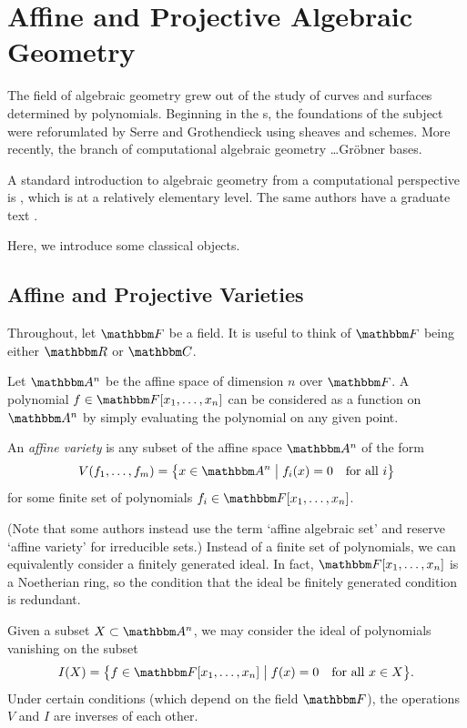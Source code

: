 \documentclass[11pt,titlepage]{article}
\newcommand*{\vbar}{\;\big\vert\;}
\begin{document}
\appendix

\section{Affine and Projective Algebraic Geometry}

    The field of algebraic geometry grew out of the study of curves and surfaces
    determined by polynomials.  Beginning in the s, the
    foundations of the subject were reforumlated by Serre and Grothendieck using
    sheaves and schemes.  More recently, the branch of computational algebraic
    geometry \ldots Gröbner bases.

    A standard introduction to algebraic geometry from a computational
    perspective is \cite{CLO92}, which is at a relatively elementary level.  The
    same authors have a graduate text \cite{CLO98}.

    Here, we introduce some classical objects.


\subsection{Affine and Projective Varieties}
    Throughout, let $\F$ be a field.  It is useful to think of $\F$ being either
    $\R$ or $\C$.

    Let $\A^n$ be the affine space of dimension $n$ over $\F$.  A polynomial $f
    \in \F[x_1, \ldots, x_n]$ can be considered as a function on $\A^n$ by
    simply evaluating the polynomial on any given point.

    \begin{definition}
        An \emph{affine variety} is any subset of the affine space $\A^n$ of the
        form
        \[
            V(f_1, \ldots, f_m)
            = \cdil[\big]{x \in \A^n \vbar f_i(x) = 0 \quad\text{for all $i$}}
        \]
        for some finite set of polynomials $f_i \in \F[x_1, \ldots, x_n]$.
    \end{definition}
    \noindent (Note that some authors instead use the term `affine algebraic
    set' and reserve `affine variety' for irreducible sets.) Instead of a finite
    set of polynomials, we can equivalently consider a finitely generated ideal.
    In fact, $\F[x_1,\ldots,x_n]$ is a Noetherian ring, so the condition that
    the ideal be finitely generated condition is redundant.

    Given a subset $X \subset \A^n$, we may consider the ideal of polynomials
    vanishing on the subset
    \[
        I(X) = \cdil[\big]{f \in \F[x_1, \ldots, x_n] \vbar f(x) = 0 \quad\text{for
        all $x \in X$}}.
    \]
    Under certain conditions (which depend on the field $\F$), the operations
    $V$ and $I$ are inverses of each other.
\end{document}
